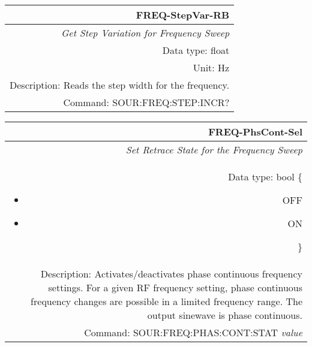 \documentclass[openany]{article}
\begin{document}
		\begin{tabular}{N}
			\hline
			\bfseries FREQ-StepVar-RB \\ \hline
			\emph{Get Step Variation for Frequency Sweep} \\
			Data type: float \\
			Unit: Hz \\
			Description: Reads the step width for the frequency. \\
			Command: SOUR:FREQ:STEP:INCR? \\

		\end{tabular}
%
		\begin{tabular}{N}
			\hline
			\bfseries FREQ-PhsCont-Sel \\ \hline
			\emph{Set Retrace State for the Frequency Sweep} \\
			Data type: bool \{\begin{itemize}[noitemsep]
				\small
				\item[] OFF
				\item[] ON
			\end{itemize}\} \\
			Description: Activates/deactivates phase continuous frequency settings. For a given RF frequency setting, phase continuous frequency changes are possible in a limited frequency range. The output sinewave is phase continuous. \\
			Command: SOUR:FREQ:PHAS:CONT:STAT \emph{value} \\

		\end{tabular}
\end{document}
